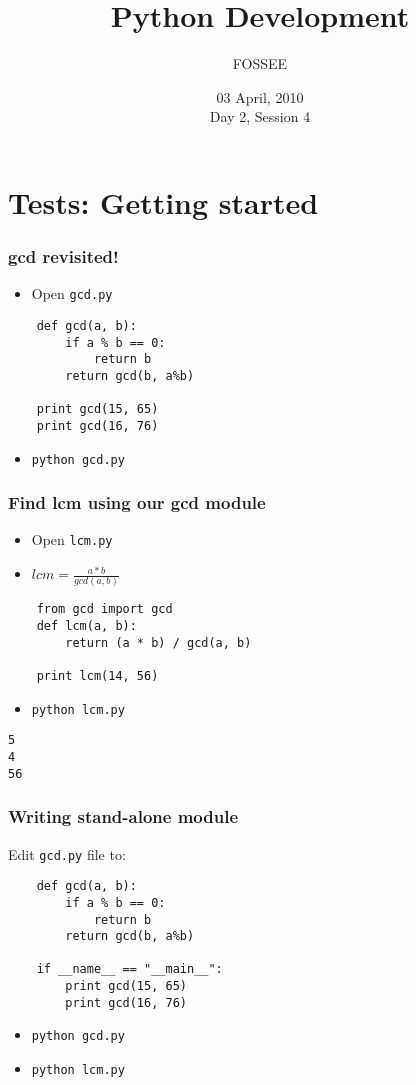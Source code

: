 \documentclass[compress,14pt]{beamer}
\title[Python Development]{Python Development}
\author[FOSSEE] {FOSSEE}
\institute[IIT Bombay] {Department of Aerospace Engineering\\IIT Bombay}
\date[] {03 April, 2010\\Day 2, Session 4}
\begin{document}
\begin{frame}
  \maketitle
\end{frame}

\section{Tests: Getting started}
\begin{frame}[fragile] 
  \frametitle{gcd revisited!}
  \begin{itemize}
  \item Open \texttt{gcd.py}
  \end{itemize}  
\begin{lstlisting}
    def gcd(a, b):
        if a % b == 0: 
            return b
        return gcd(b, a%b)

    print gcd(15, 65)
    print gcd(16, 76)
\end{lstlisting}
  \begin{itemize}
  \item \texttt{python gcd.py}
  \end{itemize}
\end{frame}

\begin{frame}[fragile] 
  \frametitle{Find lcm using our gcd module}
  \begin{itemize}
  \item Open \texttt{lcm.py}  
  \item $lcm = \frac{a * b}{gcd(a,b)}$
  \end{itemize}  
\begin{lstlisting}
    from gcd import gcd    
    def lcm(a, b):
        return (a * b) / gcd(a, b)
    
    print lcm(14, 56)
\end{lstlisting}
  \begin{itemize}
  \item \texttt{python lcm.py}
  \end{itemize}
  \begin{lstlisting}
5
4
56
  \end{lstlisting}    
\end{frame}

\begin{frame}[fragile] 
  \frametitle{Writing stand-alone module}  
Edit \texttt{gcd.py} file to:
\begin{lstlisting}
    def gcd(a, b):
        if a % b == 0: 
            return b
        return gcd(b, a%b)

    if __name__ == "__main__":        
        print gcd(15, 65)
        print gcd(16, 76)
\end{lstlisting}
  \begin{itemize}
  \item \texttt{python gcd.py}
  \item \texttt{python lcm.py}
  \end{itemize}
\end{frame}
\end{document}
